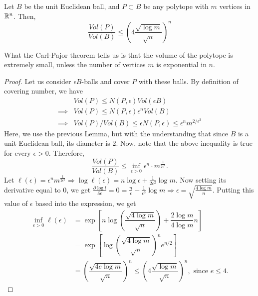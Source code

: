\documentclass[12pt]{article}
\begin{document}
\begin{theorembox}
    Let $B$ be the unit Euclidean ball, and $P \subset B$ be any polytope with $m$ vertices in $\mathbb{R}^n$. Then,
    \begin{equation*}
        \dfrac{Vol(P)}{Vol(B)} \leq \left( 4\dfrac{\sqrt{\log m}}{\sqrt{n}} \right)^n
    \end{equation*}
\end{theorembox}
\noindent What the Carl-Pajor theorem tells us is that the volume of the polytope is extremely small, unless the number of vertices $m$ is exponential in $n$.

\begin{proof}
    Let us consider $\epsilon B$-balls and cover $P$ with these balls. By definition of covering number, we have
    \begin{align*}
                 & Vol(P) \leq N(P,\epsilon) Vol(\epsilon B)                                   \\
        \implies & Vol(P) \leq N(P, \epsilon) \epsilon^n Vol(B)                                \\
        \implies & Vol(P)/Vol(B) \leq \epsilon N(P, \epsilon) \leq \epsilon^n m^{2/\epsilon^2}
    \end{align*}
    \noindent Here, we use the previous Lemma, but with the understanding that since $B$ is a unit Euclidean ball, its diameter is $2$. Now, note that the above inequality is true for every $\epsilon > 0$. Therefore,
    \begin{equation*}
        \frac{Vol(P)}{Vol(B)} \leq \inf_{\epsilon > 0} \epsilon^n \cdot m^{\frac{1}{2\epsilon^2}}.
    \end{equation*}
    \noindent Let $\ell(\epsilon) = \epsilon^n m^{\frac{1}{2\epsilon^2}} \Rightarrow \log \ell(\epsilon) = n \log \epsilon + \frac{1}{2\epsilon^2} \log m$. Now setting its derivative equal to $0$, we get $\frac{\partial \log l}{\partial \epsilon} = 0 = \frac{n}{\epsilon} - \frac{1}{\epsilon^3} \log m \Rightarrow \epsilon = \sqrt{\frac{4 \log m}{n}}$. Putting this value of $\epsilon$ based into the expression, we get
    \begin{align*}
        \inf_{\epsilon > 0} \ell(\epsilon)
         & = \exp\left[ n \log\left( \dfrac{\sqrt{4\log m}}{\sqrt{n}} \right) + \dfrac{2\log m}{4\log m} n \right] \\
         & = \exp\left[ \log\left( \dfrac{\sqrt{4\log m}}{\sqrt{n}} \right)^n e^{n/2} \right]                      \\
         & = \left( \dfrac{\sqrt{4e \log m}}{\sqrt{n}} \right)^n
        \leq \left( 4\dfrac{\sqrt{\log m}}{\sqrt{n}} \right)^n, \text{ since } e \leq 4.
    \end{align*}
\end{proof}
\end{document}

